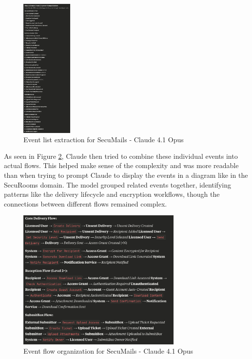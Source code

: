   \begin{figure}[htbp]
    \centering
    \includegraphics[height=7cm]{figures/secumails-event-storming-claude-1.png} 
    \caption{Event list extraction for SecuMails - Claude 4.1 Opus}
    \label{fig:event-stormin-secumails-1} 
  \end{figure}
  
  As seen in Figure \ref{fig:event-stormin-secumails-2}, Claude then tried to combine these individual events into actual flows. This helped make sense of the complexity and was more readable than when trying to prompt Claude to display the events in a diagram like in the SecuRooms domain. The model grouped related events together, identifying patterns like the delivery lifecycle and encryption workflows, though the connections between different flows remained complex.
  
  \begin{figure}[htbp]
    \centering
    \includegraphics[height=7cm]{figures/secumails-claude-event-storming-2.png} 
    \caption{Event flow organization for SecuMails - Claude 4.1 Opus}
    \label{fig:event-stormin-secumails-2} 
  \end{figure}
  
